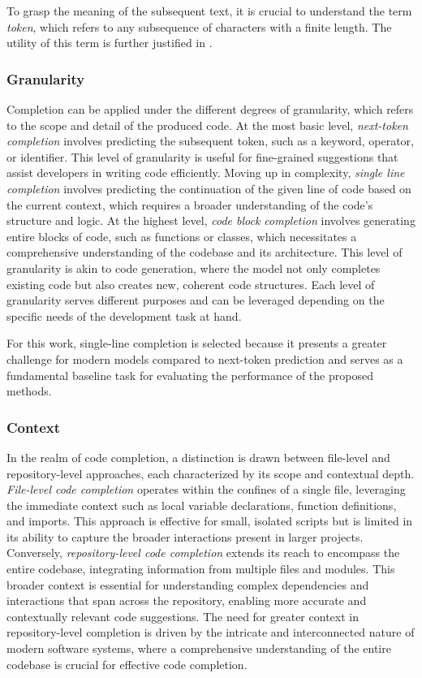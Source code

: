 To grasp the meaning of the subsequent text, it is crucial to understand the term \textit{token}, which refers to any subsequence of characters with a finite length. The utility of this term is further justified in .

\subsubsection*{Granularity}

Completion can be applied under the different degrees of granularity, which refers to the scope and detail of the produced code. At the most basic level, \textit{next-token completion} involves predicting the subsequent token, such as a keyword, operator, or identifier. This level of granularity is useful for fine-grained suggestions that assist developers in writing code efficiently. Moving up in complexity, \textit{single line completion} involves predicting the continuation of the given line of code based on the current context, which requires a broader understanding of the code's structure and logic. At the highest level, \textit{code block completion} involves generating entire blocks of code, such as functions or classes, which necessitates a comprehensive understanding of the codebase and its architecture. This level of granularity is akin to code generation, where the model not only completes existing code but also creates new, coherent code structures. Each level of granularity serves different purposes and can be leveraged depending on the specific needs of the development task at hand.

For this work, single-line completion is selected because it presents a greater challenge for modern models compared to next-token prediction and serves as a fundamental baseline task for evaluating the performance of the proposed methods.

\subsubsection*{Context}

In the realm of code completion, a distinction is drawn between file-level and repository-level approaches, each characterized by its scope and contextual depth. \textit{File-level code completion} operates within the confines of a single file, leveraging the immediate context such as local variable declarations, function definitions, and imports. This approach is effective for small, isolated scripts but is limited in its ability to capture the broader interactions present in larger projects. Conversely, \textit{repository-level code completion} extends its reach to encompass the entire codebase, integrating information from multiple files and modules. This broader context is essential for understanding complex dependencies and interactions that span across the repository, enabling more accurate and contextually relevant code suggestions. The need for greater context in repository-level completion is driven by the intricate and interconnected nature of modern software systems, where a comprehensive understanding of the entire codebase is crucial for effective code completion.

